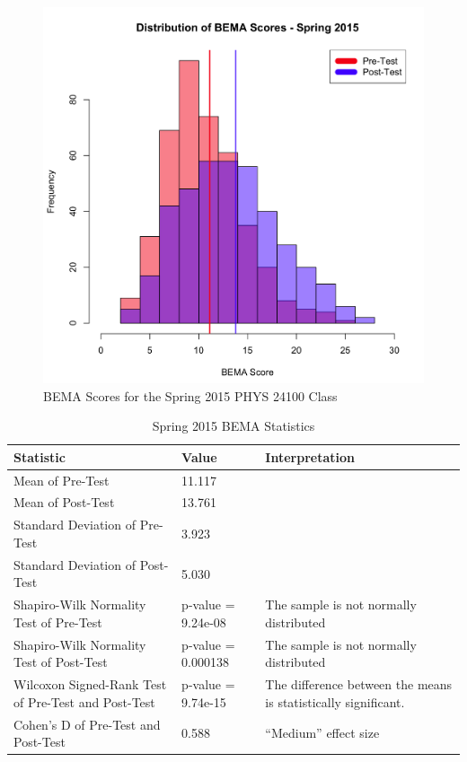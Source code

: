 \begin{figure}[!htb]
	\centering
	\includegraphics[width=6in]{img/chapter4/bema_spring_2015}
	\caption[BEMA Scores for the Spring 2015 PHYS 24100 Class]{BEMA Scores for the Spring 2015 PHYS 24100 Class}
  \label{fig:bemaSp15}
\end{figure}

\pagebreak

\begin{landscape}
\begin{table}[!ht]
  \centering
  \begin{tabular}{|l|l|l|}
    \hline
    \textbf{Statistic} & \textbf{Value} & \textbf{Interpretation}\\
	\hline
	Mean of Pre-Test & 11.117 & \\
	\hline
	Mean of Post-Test & 13.761 & \\
	\hline
	Standard Deviation of Pre-Test & 3.923 & \\
	\hline
	Standard Deviation of Post-Test & 5.030 & \\
	\hline
	Shapiro-Wilk Normality Test of Pre-Test & p-value = 9.24e-08 & The sample is not normally distributed \\
	\hline
	Shapiro-Wilk Normality Test of Post-Test & p-value = 0.000138 & The sample is not normally distributed \\
	\hline
	Wilcoxon Signed-Rank Test of Pre-Test and Post-Test & p-value = 9.74e-15 & The difference between the means is statistically significant. \\
	\hline
	Cohen's D of Pre-Test and Post-Test & 0.588 & ``Medium'' effect size \\
	\hline
  \end{tabular}
  \caption{Spring 2015 BEMA Statistics}
  \label{tab:statsSp15}
\end{table}
\end{landscape}


